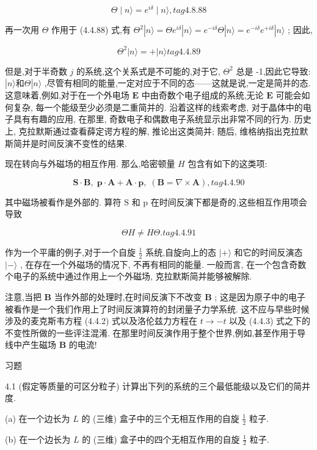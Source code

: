 $$
\Theta \mid n\rangle = {e}^{i\delta } \mid n\rangle , tag{4. 8.88}
$$

再一次用 $\Theta$ 作用于 (4.4.88) 式,有 ${\Theta }^{2}\left| {n\rangle = \Theta {e}^{i\delta }}\right| n\rangle = {e}^{-{i\delta }}\Theta \left| {n\rangle = {e}^{-{i\delta }}{e}^{+{i\delta }}}\right| n\rangle$ ; 因此,

$$
{\Theta }^{2}\left| {n\rangle = + }\right| n\rangle tag{4. 4.89}
$$

但是,对于半奇数 $j$ 的系统,这个关系式是不可能的,对于它, ${\Theta }^{2}$ 总是 -1,因此它导致: $\left| {n\rangle \text{和}\Theta }\right| n\rangle$ ,尽管有相同的能量,一定对应于不同的态——这就是说,一定是简并的态. 这意味着,例如,对于在一个外电场 $\mathbf{E}$ 中由奇数个电子组成的系统,无论 $\mathbf{E}$ 可能会如何复杂, 每一个能级至少必须是二重简并的. 沿着这样的线索考虑, 对于晶体中的电子具有有趣的应用, 在那里, 奇数电子和偶数电子系统显示出非常不同的行为. 历史上, 克拉默斯通过查看薛定谔方程的解, 推论出这类简并; 随后, 维格纳指出克拉默斯简并是时间反演不变性的结果.

现在转向与外磁场的相互作用. 那么,哈密顿量 $H$ 包含有如下的这类项:

$$
\mathbf{S} \cdot \mathbf{B},\;\mathbf{p} \cdot \mathbf{A} + \mathbf{A} \cdot \mathbf{p},\;\left( {\mathbf{B} = \nabla \times \mathbf{A}}\right) , tag{4. 4.90}
$$

其中磁场被看作是外部的. 算符 $\mathrm{S}$ 和 $\mathrm{p}$ 在时间反演下都是奇的,这些相互作用项会导致

$$
{\Theta H} \neq {H\Theta }\text{.} tag{4. 4.91}
$$

作为一个平庸的例子,对于一个自旋 $\frac{1}{2}$ 系统,自旋向上的态 $| + \rangle$ 和它的时间反演态 $| - \rangle$ , 在存在一个外磁场的情况下, 不再有相同的能量. 一般而言, 在一个包含奇数个电子的系统中通过作用上一个外磁场, 克拉默斯简并能够被解除.

注意,当把 $\mathbf{B}$ 当作外部的处理时,在时间反演下不改变 $\mathbf{B}$ ; 这是因为原子中的电子被看作是一个我们作用上了时间反演算符的封闭量子力学系统. 这不应与早些时候涉及的麦克斯韦方程 (4.4.2) 式以及洛伦兹力方程在 $t \rightarrow - t$ 以及 (4.4.3) 式之下的不变性所做的一些评注混淆. 在那里时间反演作用于整个世界,例如,甚至作用于导线中产生磁场 $\mathbf{B}$ 的电流!

习题

4.1 (假定等质量的可区分粒子) 计算出下列的系统的三个最低能级以及它们的简并度.

(a) 在一个边长为 $L$ 的 (三维) 盒子中的三个无相互作用的自旋 $\frac{1}{2}$ 粒子.

(b) 在一个边长为 $L$ 的 (三维) 盒子中的四个无相互作用的自旋 $\frac{1}{2}$ 粒子.

